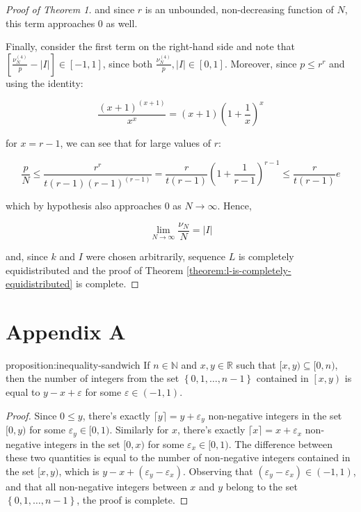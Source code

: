 \documentclass[11pt,a4paper]{tesis}
\theoremstyle{plain}
\theoremstyle{definition}
\begin{document}
\begin{proof}[Proof of Theorem 1]
  and since $r$ is an unbounded, non-decreasing function of $N$, this term approaches $0$ as well.

  Finally, consider the first term on the right-hand side and note that $\left[ \frac{\nu^{(4)}_N}{p} - |I| \right] \in [-1, 1]$, since both $\frac{\nu^{(4)}_N}{p}, |I| \in [0, 1]$. Moreover, since $p \le r^r$ and using the identity:

  \begin{equation*}
    \frac{(x + 1)^{(x + 1)}}{x^x} = (x + 1) \left(1 + \frac{1}{x} \right)^x
  \end{equation*}

  for $x = r - 1$, we can see that for large values of $r$:

  \begin{equation*}
    \frac{p}{N} \le \frac{r^r}{t(r - 1) (r - 1)^{(r - 1)}} = \frac{r}{t(r - 1)} \left( 1 + \frac{1}{r - 1} \right)^{r - 1} \le \frac{r}{t(r - 1)} e
  \end{equation*}

  which by hypothesis also approaches $0$ as $N \to \infty$. Hence,

  \begin{equation*}
    \lim_{N \to \infty} \frac{\nu_N}{N} = |I|
  \end{equation*}

  and, since $k$ and $I$ were chosen arbitrarily, sequence $L$ is completely equidistributed and the proof of Theorem \ref{theorem:l-is-completely-equidistributed} is complete.

\end{proof}

\appendix

\section*{Appendix A}

\begin{repproposition}{proposition:inequality-sandwich}
  If $n \in \mathbb{N}$ and $x, y \in \mathbb{R}$ such that $[x, y) \subseteq [0, n)$, then the number of integers from the set $\left \{ 0, 1, \dots, n - 1 \right \}$ contained in $\left[x, y\right)$ is equal to $y - x + \varepsilon$ for some $\varepsilon \in (-1, 1)$.
\end{repproposition}

\begin{proof}
  Since $0 \le y$, there's exactly $\lceil y \rceil = y + \varepsilon_y$ non-negative integers in the set $[0, y)$ for some $\varepsilon_y \in [0, 1)$. Similarly for $x$, there's exactly $\lceil x \rceil = x + \varepsilon_x$ non-negative integers in the set $[0, x)$ for some $\varepsilon_x \in [0, 1)$. The difference between these two quantities is equal to the number of non-negative integers contained in the set $[x, y)$, which is $y - x + (\varepsilon_y - \varepsilon_x)$. Observing that $(\varepsilon_y - \varepsilon_x) \in (-1, 1)$, and that all non-negative integers between $x$ and $y$ belong to the set $\left \{ 0, 1, \dots, n - 1 \right \}$, the proof is complete.
\end{proof}
\end{document}
